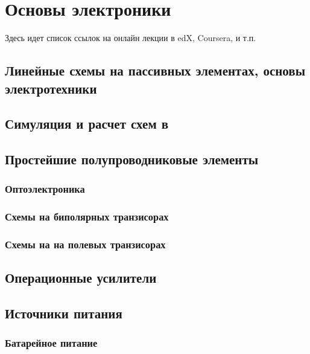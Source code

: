 


\tableofcontents\clearpage





\part{Основы электроники}

Здесь идет список ссылок на онлайн лекции в edX, Coursera, и т.п.

\chapter{Линейные схемы на пассивных элементах, основы электротехники}

\chapter{Симуляция и расчет схем в \spice}



\chapter{Простейшие полупроводниковые элементы}

\section{Оптоэлектроника}

\section{Схемы на биполярных транзисорах} 

\section{Схемы на на полевых транзисорах}

\chapter{Операционные усилители}

\chapter{Источники питания}

\section{Батарейное питание}

